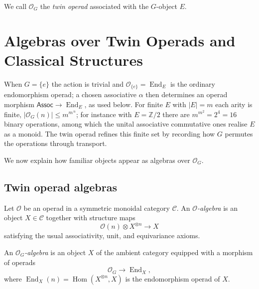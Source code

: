 \documentclass[11pt,a4paper]{article}
\numberwithin{equation}{section}
\newcommand{\Z}{\mathbb{Z}}
\DeclareMathOperator{\End}{End}
\DeclareMathOperator{\Hom}{Hom}
\newcommand{\abs}[1]{\left\lvert #1 \right\rvert}
\begin{document}
	\begin{definition}
		We call $\mathcal{O}_G$ the \emph{twin operad} associated with the $G$-object $E$.
	\end{definition}
	
	\section{Algebras over Twin Operads and Classical Structures}
	\label{sec:algebras}

	\begin{example}\label{ex:small-operad}
		When $G=\{e\}$ the action is trivial and $\mathcal{O}_{\{e\}}=\End_E$ is the ordinary endomorphism operad; a
		chosen associative $\alpha$ then determines an operad morphism $\mathsf{Assoc}\to\End_E$, as used below. For
		finite $E$ with $\abs{E}=m$ each arity is finite, $\abs{\mathcal{O}_G(n)}\le m^{m^{\,n}}$; for instance with
		$E=\Z/2$ there are $m^{m^2}=2^4=16$ binary operations, among which the unital associative commutative ones
		realise $E$ as a monoid. The twin operad refines this finite set by recording how $G$ permutes the operations
		through transport.
	\end{example}
	
	We now explain how familiar objects appear as algebras over $\mathcal{O}_G$.
	
	\subsection{Twin operad algebras}
	
	\begin{definition}
		Let $\mathcal{O}$ be an operad in a symmetric monoidal category $\mathcal{C}$.
		An \emph{$\mathcal{O}$-algebra} is an object $X\in\mathcal{C}$ together with structure maps
		\[
		\mathcal{O}(n)\otimes X^{\otimes n} \to X
		\]
		satisfying the usual associativity, unit, and equivariance axioms.
	\end{definition}
	
	\begin{definition}
		An \emph{$\mathcal{O}_G$-algebra} is an object $X$ of the ambient category equipped with a morphism of operads
		\[
		\mathcal{O}_G \to \End_X,
		\]
		where $\End_X(n)=\Hom(X^{\otimes n},X)$ is the endomorphism operad of $X$.
	\end{definition}
	
\end{document}
